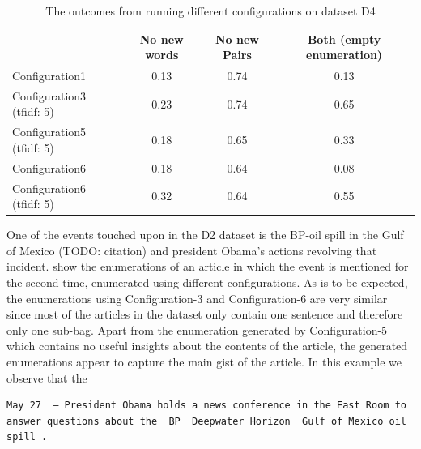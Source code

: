 \begin{center}
\begin{table}
  \begin{tabular}{|l|c|c|c|}
    \hline
    &  No new words & No new Pairs & Both (empty enumeration) \\ \hline
    Configuration1                    & 0.13  & 0.74  & 0.13 \\ \hline
    Configuration3 (tfidf: 5)         & 0.23  & 0.74  & 0.65 \\ \hline
    Configuration5 (tfidf: 5)         & 0.18  & 0.65  & 0.33 \\ \hline
    Configuration6                    & 0.18  & 0.64  & 0.08 \\ \hline
    Configuration6 (tfidf: 5)         & 0.32  & 0.64  & 0.55 \\ \hline
  \end{tabular}
  \caption{The outcomes from running different configurations on dataset D4}
  \label{tab:d4}
\end{table}
\end{center}

One of the events touched upon in the D2 dataset is the BP-oil spill in the Gulf of Mexico (TODO: citation) and president Obama's actions revolving that incident.  show the enumerations of an article in which the event is mentioned for the second time, enumerated using different configurations. As is to be expected, the enumerations using Configuration-3 and Configuration-6 are very similar since most of the articles in the dataset only contain one sentence and therefore only one sub-bag. Apart from the enumeration generated by Configuration-5 which contains no useful insights about the contents of the article, the generated enumerations appear to capture the main gist of the article.
In this example we observe that the

\begin{lstlisting}[caption=Original text,
    label={lst:original},
  ]
  May 27  – President Obama holds a news conference in the East Room to answer questions about the  BP  Deepwater Horizon  Gulf of Mexico oil spill . 
\end{lstlisting}

